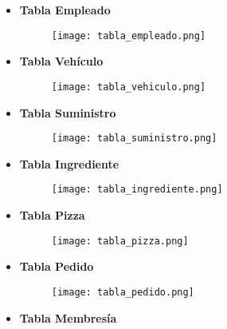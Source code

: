 \documentclass[a4paper]{article}
\begin{document}
\begin{itemize}

    \item \textbf{\large{Tabla Empleado}}
    
    \begin{figure}[H]
        \centering
        \texttt{[image: tabla\_empleado.png]}
        \label{fig:tabla_empleado}
    \end{figure}
    
    \item \textbf{\large{Tabla Vehículo}}

    \begin{figure}[H]
        \centering
        \texttt{[image: tabla\_vehiculo.png]}
        \label{fig:tabla_vehiculo}
    \end{figure}

\newpage

    \item \textbf{\large{Tabla Suministro}}

    \begin{figure}[H]
        \centering
        \texttt{[image: tabla\_suministro.png]}
        \label{fig:tabla_suministro}
    \end{figure}

    \item \textbf{\large{Tabla Ingrediente}}

    \begin{figure}[H]
        \centering
        \texttt{[image: tabla\_ingrediente.png]}
        \label{fig:tabla_ingrediente}
    \end{figure}

    \item \textbf{\large{Tabla Pizza}}

    \begin{figure}[H]
        \centering
        \texttt{[image: tabla\_pizza.png]}
        \label{fig:tabla_pizza}
    \end{figure}

    \item \textbf{\large{Tabla Pedido}}

    \begin{figure}[H]
        \centering
        \texttt{[image: tabla\_pedido.png]}
        \label{fig:tabla_pedido}
    \end{figure}

\newpage

    \item \textbf{\large{Tabla Membresía}}


\end{itemize}
\end{document}
